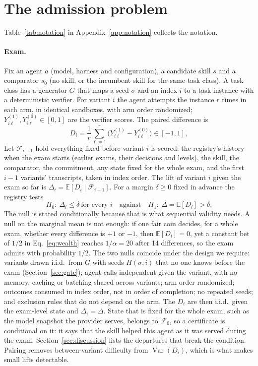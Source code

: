 \section{The admission problem}
\label{sec:setup}

Table~\ref{tab:notation} in Appendix~\ref{app:notation} collects the notation.

\paragraph{Exam.} Fix an agent $a$ (model, harness and configuration), a candidate skill $s$ and a comparator $s_0$ (no skill, or the incumbent skill for the same task class). A task class has a generator $G$ that maps a seed $\sigma$ and an index $i$ to a task instance with a deterministic verifier. For variant $i$ the agent attempts the instance $r$ times in each arm, in identical sandboxes, with arm order randomized; $Y^{(1)}_{i\ell},Y^{(0)}_{i\ell}\in[0,1]$ are the verifier scores. The paired difference is
\begin{equation}
D_i=\frac1r\sum_{\ell=1}^r\bigl(Y^{(1)}_{i\ell}-Y^{(0)}_{i\ell}\bigr)\in[-1,1],
\label{eq:D}
\end{equation}
Let $\mathcal F_{i-1}$ hold everything fixed before variant $i$ is scored: the registry's history when the exam starts (earlier exams, their decisions and levels), the skill, the comparator, the commitment, any state fixed for the whole exam, and the first $i-1$ variants' transcripts, taken in index order. The lift of variant $i$ given the exam so far is $\Delta_i=\mathbb E[D_i\mid\mathcal F_{i-1}]$. For a margin $\delta\ge0$ fixed in advance the registry tests
\begin{equation}
H_0:\ \Delta_i\le\delta\ \text{for every } i\quad\text{against}\quad H_1:\ \Delta=\mathbb E[D_i]>\delta .
\label{eq:H}
\end{equation}
The null is stated conditionally because that is what sequential validity needs. A null on the marginal mean is not enough: if one fair coin decides, for a whole exam, whether every difference is $+1$ or $-1$, then $\mathbb E[D_i]=0$, yet a constant bet of $1/2$ in Eq.~\eqref{eq:wealth} reaches $1/\alpha=20$ after 14 differences, so the exam admits with probability $1/2$. The two nulls coincide under the design we require: variants drawn i.i.d.\ from $G$ with seeds $H(\sigma,i)$ that no one knows before the exam (Section~\ref{sec:gate}); agent calls independent given the variant, with no memory, caching or batching shared across variants; arm order randomized; outcomes consumed in index order, not in order of completion; no repeated seeds; and exclusion rules that do not depend on the arm. The $D_i$ are then i.i.d.\ given the exam-level state and $\Delta_i=\Delta$. State that is fixed for the whole exam, such as the model snapshot the provider serves, belongs to $\mathcal F_0$, so a certificate is conditional on it: it says that the skill helped this agent as it was served during the exam. Section~\ref{sec:discussion} lists the departures that break the condition. Pairing removes between-variant difficulty from $\operatorname{Var}(D_i)$, which is what makes small lifts detectable.

